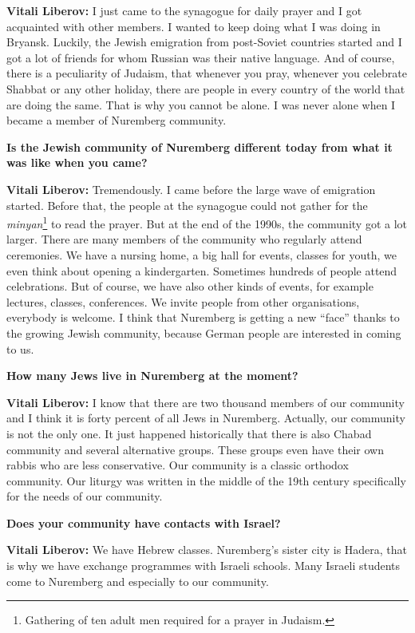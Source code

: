 \textbf{Vitali Liberov:} I just came to the synagogue for daily prayer and I got acquainted with other members. I wanted to keep doing what I was doing in Bryansk. Luckily, the Jewish emigration from post-Soviet countries started and I got a lot of friends for whom Russian was their native language. And of course, there is a peculiarity of Judaism, that whenever you pray, whenever you celebrate Shabbat or any other holiday, there are people in every country of the world that are doing the same. That is why you cannot be alone. I was never alone when I became a member of Nuremberg community.  

\textbf{Is the Jewish community of Nuremberg different today from what it was like when you came?} 

\textbf{Vitali Liberov:} Tremendously. I came before the large wave of emigration started. Before that, the people at the synagogue could not gather for the \textit{minyan}\footnote{Gathering of ten adult men required for a prayer in Judaism.} to read the prayer. But at the end of the 1990s, the community got a lot larger. There are many members of the community who regularly attend ceremonies. We have a nursing home, a big hall for events, classes for youth, we even think about opening a kindergarten. Sometimes hundreds of people attend celebrations.  But of course, we have also other kinds of events, for example lectures, classes, conferences. We invite people from other organisations, everybody is welcome. I think that Nuremberg is getting a new ``face'' thanks to the growing Jewish community, because German people are interested in coming to us.    

\textbf{How many Jews live in Nuremberg at the moment?} 

\textbf{Vitali Liberov:} I know that there are two thousand members of our community and I think it is forty percent of all Jews in Nuremberg. Actually, our community is not the only one. It just happened historically that there is also Chabad community and several alternative groups. These groups even have their own rabbis who are less conservative. Our community is a classic orthodox community. 
Our liturgy was written in the middle of the 19th century specifically for the needs of our community.   

\textbf{Does your community have contacts with Israel?} 

\textbf{Vitali Liberov:} We have Hebrew classes. Nuremberg’s sister city is Hadera, that is why we have exchange programmes with Israeli schools. Many Israeli students come to Nuremberg and especially to our community. 

